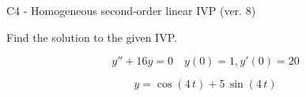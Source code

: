 \begin{exercise}
  \begin{exerciseTitle}C4 - Homogeneous second-order linear IVP (ver. 8)\end{exerciseTitle}
  \begin{exerciseStatement}
    
Find the solution to the given IVP.

    
\[y''+16y = 0 \hspace{1em} y(0) = 1 , y'(0) = 20\]

  \end{exerciseStatement}
  \begin{exerciseAnswer}
    
\[y= \cos\left(4 \, t\right) + 5 \, \sin\left(4 \, t\right)\]

  \end{exerciseAnswer}
\end{exercise}